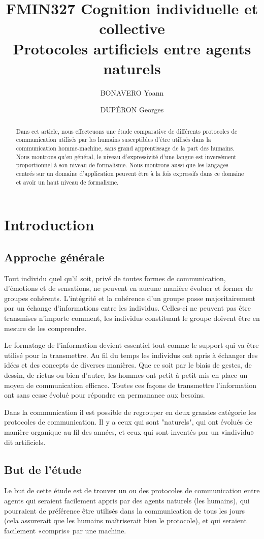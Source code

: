 \documentclass[french,a4paper]{article}
\title{FMIN327 Cognition individuelle et collective\\Protocoles artificiels entre agents naturels}
\author{BONAVERO Yoann \and DUPÉRON Georges}
\begin{document}
\maketitle
\begin{abstract}
  Dans cet article, nous effecteuons une étude comparative de
  différents protocoles de communication utilisés par les humains
  susceptibles d'être utilisés dans la communication homme-machine,
  sans grand apprentissage de la part des humains. Nous montrons qu'en
  général, le niveau d'expressivité d'une langue est inversément
  proportionnel à son niveau de formalisme. Nous montrons aussi que
  les langages centrés sur un domaine d'application peuvent être à la
  fois expressifs dans ce domaine et avoir un haut niveau de
  formalisme.
\end{abstract}
\tableofcontents
\newpage

\section{Introduction}
\subsection{Approche générale}
Tout individu quel qu'il soit, privé de toutes formes de communication, 
d'émotions et de sensations, ne peuvent en aucune manière évoluer et 
former de groupes cohérents. L'intégrité et la cohérence d'un groupe 
passe majoritairement par un échange d'informations entre les individus.
Celles-ci ne peuvent pas être transmises n'importe comment, les individus 
constituant le groupe doivent être en mesure de les comprendre. 

Le formatage de l'information devient essentiel tout comme le 
support qui va être utilisé pour la transmettre.
Au fil du temps les individus ont apris à échanger des idées et des 
concepts de diverses manières. Que ce soit par le biais de gestes, de 
dessin, de rictus ou bien d'autre, les hommes ont petit à petit mis en 
place un moyen de communication efficace. Toutes ces façons de 
transmettre l'information ont sans cesse évolué pour répondre en 
permanance aux besoins.

Dans la communication il est possible de regrouper en deux grandes
catégorie les protocoles de communication. Il y a ceux qui sont
"naturels", qui ont évolués de manière organique au fil des années, et
ceux qui sont inventés par un «individu» dit artificiels.

\subsection{But de l'étude}
Le but de cette étude est de trouver un ou des protocoles de
communication entre agents qui seraient facilement appris par des
agents naturels (les humains), qui pourraient de préférence être
utilisés dans la communication de tous les jours (cela assurerait que
les humains maîtriserait bien le protocole), et qui seraient
facilement «compris» par une machine.
\end{document}
